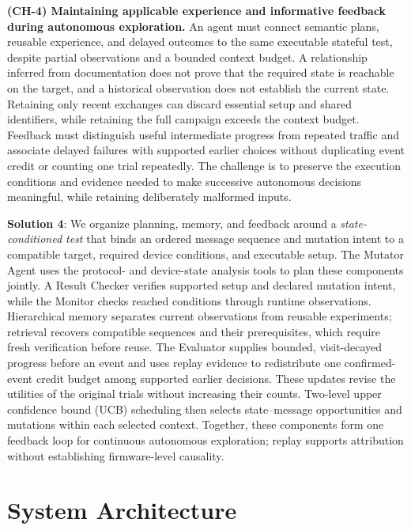 \documentclass[10pt,journal,compsoc]{IEEEtran}
\begin{document}
\noindent \textbf{(CH-4) Maintaining applicable experience and informative feedback during autonomous exploration.}\label{challenge4}
An agent must connect semantic plans, reusable experience, and delayed outcomes to the same executable stateful test, despite partial observations and a bounded context budget. A relationship inferred from documentation does not prove that the required state is reachable on the target, and a historical observation does not establish the current state. Retaining only recent exchanges can discard essential setup and shared identifiers, while retaining the full campaign exceeds the context budget. Feedback must distinguish useful intermediate progress from repeated traffic and associate delayed failures with supported earlier choices without duplicating event credit or counting one trial repeatedly. The challenge is to preserve the execution conditions and evidence needed to make successive autonomous decisions meaningful, while retaining deliberately malformed inputs.\vspace{0.1cm}

\noindent \checkmark \; \textbf{Solution 4}: We organize planning, memory, and feedback around a \emph{state-conditioned test} that binds an ordered message sequence and mutation intent to a compatible target, required device conditions, and executable setup. The Mutator Agent uses the protocol- and device-state analysis tools to plan these components jointly. A Result Checker verifies supported setup and declared mutation intent, while the Monitor checks reached conditions through runtime observations. Hierarchical memory separates current observations from reusable experiments; retrieval recovers compatible sequences and their prerequisites, which require fresh verification before reuse. The Evaluator supplies bounded, visit-decayed progress before an event and uses replay evidence to redistribute one confirmed-event credit budget among supported earlier decisions. These updates revise the utilities of the original trials without increasing their counts. Two-level upper confidence bound (UCB) scheduling then selects state--message opportunities and mutations within each selected context. Together, these components form one feedback loop for continuous autonomous exploration; replay supports attribution without establishing firmware-level causality.

\section{System Architecture} \label{sa}
\end{document}
